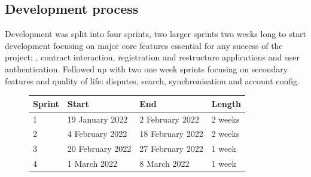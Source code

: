 \subsection{Development process}

Development was split into four sprints, two larger sprints two weeks long to start development focusing on major core features essential for any success of the project: , contract interaction, registration and restructure applications and user authentication. Followed up with two one week sprints focusing on secondary features and quality of life: disputes, search, synchronisation and account config.

\begin{figure}[H]
\hfil
\begin{tabular}{|p{}|p{}|p{}|p{}|}
\hline
Sprint & Start            & End              & Length  \\ \hline
1      & 19 January 2022  & 2 February 2022  & 2 weeks \\ \hline
2      & 4 February 2022  & 18 February 2022 & 2 weeks \\ \hline
3      & 20 February 2022 & 27 February 2022 & 1 week  \\ \hline
4      & 1 March 2022     & 8 March 2022     & 1 week  \\ \hline
\end{tabular}
\end{figure}